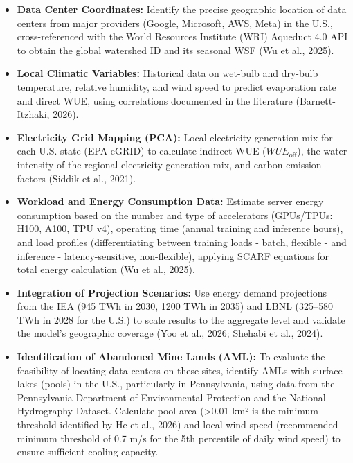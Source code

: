 \documentclass[conference]{IEEEtran}
\begin{document}
\begin{itemize}
\item \textbf{Data Center Coordinates:} Identify the precise geographic location of data centers from major providers (Google, Microsoft, AWS, Meta) in the U.S., cross-referenced with the World Resources Institute (WRI) Aqueduct 4.0 API to obtain the global watershed ID and its seasonal WSF (Wu et al., 2025).

\item \textbf{Local Climatic Variables:} Historical data on wet-bulb and dry-bulb temperature, relative humidity, and wind speed to predict evaporation rate and direct WUE, using correlations documented in the literature (Barnett-Itzhaki, 2026).

\item \textbf{Electricity Grid Mapping (PCA):} Local electricity generation mix for each U.S. state (EPA eGRID) to calculate indirect WUE ($WUE_{\text{off}}$), the water intensity of the regional electricity generation mix, and carbon emission factors (Siddik et al., 2021).

\item \textbf{Workload and Energy Consumption Data:} Estimate server energy consumption based on the number and type of accelerators (GPUs/TPUs: H100, A100, TPU v4), operating time (annual training and inference hours), and load profiles (differentiating between training loads - batch, flexible - and inference - latency-sensitive, non-flexible), applying SCARF equations for total energy calculation (Wu et al., 2025).

\item \textbf{Integration of Projection Scenarios:} Use energy demand projections from the IEA (945 TWh in 2030, 1200 TWh in 2035) and LBNL (325–580 TWh in 2028 for the U.S.) to scale results to the aggregate level and validate the model's geographic coverage (Yoo et al., 2026; Shehabi et al., 2024).

\item \textbf{Identification of Abandoned Mine Lands (AML):} To evaluate the feasibility of locating data centers on these sites, identify AMLs with surface lakes (pools) in the U.S., particularly in Pennsylvania, using data from the Pennsylvania Department of Environmental Protection and the National Hydrography Dataset. Calculate pool area (>0.01 km² is the minimum threshold identified by He et al., 2026) and local wind speed (recommended minimum threshold of 0.7 m/s for the 5th percentile of daily wind speed) to ensure sufficient cooling capacity.
\end{itemize}
\end{document}
